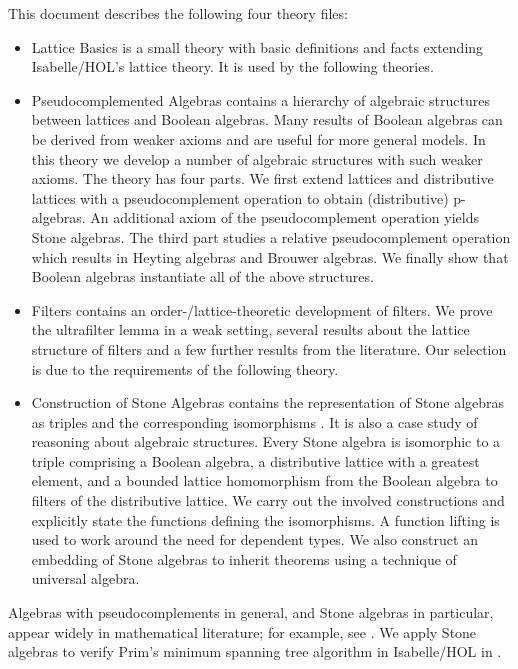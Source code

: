 \documentclass[11pt,a4paper]{article}
\begin{document}
This document describes the following four theory files:
\begin{itemize}
\item Lattice Basics is a small theory with basic definitions and facts extending Isabelle/HOL's lattice theory.
      It is used by the following theories.
\item Pseudocomplemented Algebras contains a hierarchy of algebraic structures between lattices and Boolean algebras.
      Many results of Boolean algebras can be derived from weaker axioms and are useful for more general models.
      In this theory we develop a number of algebraic structures with such weaker axioms.
      The theory has four parts.
      We first extend lattices and distributive lattices with a pseudocomplement operation to obtain (distributive) p-algebras.
      An additional axiom of the pseudocomplement operation yields Stone algebras.
      The third part studies a relative pseudocomplement operation which results in Heyting algebras and Brouwer algebras.
      We finally show that Boolean algebras instantiate all of the above structures.
\item Filters contains an order-/lattice-theoretic development of filters.
      We prove the ultrafilter lemma in a weak setting, several results about the lattice structure of filters and a few further results from the literature.
      Our selection is due to the requirements of the following theory.
\item Construction of Stone Algebras contains the representation of Stone algebras as triples and the corresponding isomorphisms \cite{ChenGraetzer1969,Katrinak1973}.
      It is also a case study of reasoning about algebraic structures.
      Every Stone algebra is isomorphic to a triple comprising a Boolean algebra, a distributive lattice with a greatest element, and a bounded lattice homomorphism from the Boolean algebra to filters of the distributive lattice.
      We carry out the involved constructions and explicitly state the functions defining the isomorphisms.
      A function lifting is used to work around the need for dependent types.
      We also construct an embedding of Stone algebras to inherit theorems using a technique of universal algebra.
\end{itemize}
Algebras with pseudocomplements in general, and Stone algebras in particular, appear widely in mathematical literature; for example, see \cite{BalbesDwinger1974,Birkhoff1967,Blyth2005,Graetzer1971}.
We apply Stone algebras to verify Prim's minimum spanning tree algorithm in Isabelle/HOL in \cite{Guttmann2016c}.
\end{document}
